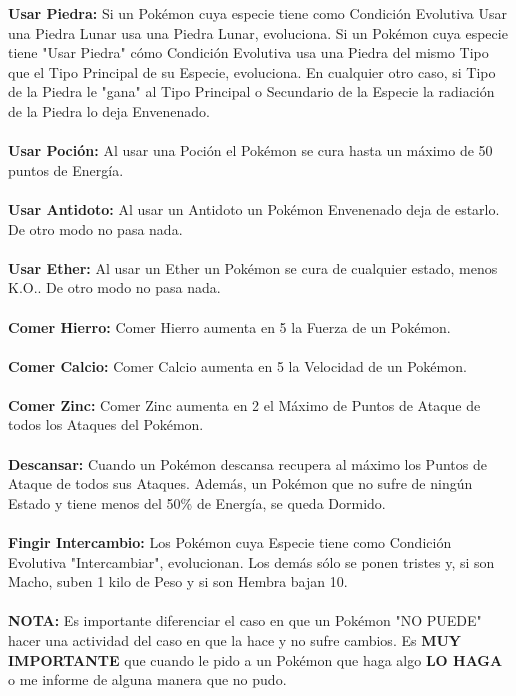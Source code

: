 \documentclass[spanish,a4paper]{article}
\begin{document}
\textbf{Usar Piedra:}\newline
Si un Pokémon cuya especie tiene como Condición Evolutiva Usar una Piedra Lunar usa una Piedra Lunar, evoluciona.\newline
Si un Pokémon cuya especie tiene "Usar Piedra" cómo Condición Evolutiva usa una Piedra del mismo Tipo que el Tipo Principal de su Especie, evoluciona.\newline
En cualquier otro caso, si Tipo de la Piedra le "gana" al Tipo Principal o Secundario de la Especie la radiación de la Piedra lo deja Envenenado.
\\\\
\textbf{Usar Poción:}\newline
Al usar una Poción el Pokémon se cura hasta un máximo de 50 puntos de Energía.
\\\\
\textbf{Usar Antidoto:}\newline
Al usar un Antidoto un Pokémon Envenenado deja de estarlo. De otro modo no pasa nada.
\\\\
\textbf{Usar Ether:}\newline
Al usar un Ether un Pokémon se cura de cualquier estado, menos K.O.. De otro modo no pasa nada.
\\\\
\textbf{Comer Hierro:}\newline
Comer Hierro aumenta en 5 la Fuerza de un Pokémon.
\\\\
\textbf{Comer Calcio:}\newline
Comer Calcio aumenta en 5 la Velocidad de un Pokémon.
\\\\
\textbf{Comer Zinc:}\newline
Comer Zinc aumenta en 2 el Máximo de Puntos de Ataque de todos los Ataques del Pokémon.
\\\\
\textbf{Descansar:}\newline
Cuando un Pokémon descansa recupera al máximo los Puntos de Ataque de todos sus Ataques.
Además, un Pokémon que no sufre de ningún Estado y tiene menos del 50\% de Energía, se queda Dormido.
\\\\
\textbf{Fingir Intercambio:}\newline
Los Pokémon cuya Especie tiene como Condición Evolutiva "Intercambiar", evolucionan.
Los demás sólo se ponen tristes y, si son Macho, suben 1 kilo de Peso y si son Hembra bajan 10.
\\\\
\textbf{NOTA:} Es importante diferenciar el caso en que un Pokémon "NO PUEDE" hacer una actividad del caso en que la hace y no sufre cambios. 
Es \textbf{MUY IMPORTANTE} que cuando le pido a un Pokémon que haga algo \textbf{LO HAGA} o me informe de alguna manera que no pudo.
\end{document}
